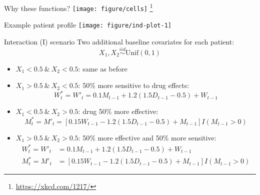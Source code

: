 \documentclass[handout]{beamer}
\newcommand\blfootnote[1]{%
  \begingroup
  \renewcommand\thefootnote{}\footnote{#1}%
  \addtocounter{footnote}{-1}%
  \endgroup
}
\begin{document}
\begin{frame}[c]{Why these functions?}
  \centering
  \texttt{[image: figure/cells]}
  \bigskip
  \blfootnote{\url{https://xkcd.com/1217/}}
\end{frame}

\begin{frame}[c]{Example patient profile}
  \texttt{[image: figure/ind-plot-1]} 
\end{frame}

\begin{frame}[c]{Interaction (I) scenario}
  Two additional baseline covariates for each patient:
  \begin{equation*}
    X_{1}, X_{2} \overset{iid}{\sim} \text{Unif}(0, 1)
  \end{equation*}
  
  \begin{itemize}[<+->]
    \item[] $X_{1} < 0.5 \ \& \ X_{2} < 0.5$: same as before
    \item[] $X_{1} > 0.5 \ \& \ X_{2} < 0.5$: 50\% more sensitive to drug effects:
  \begin{equation*}
  W^{*}_{t} = W'_{t} = 0.1 M_{t-1} + 1.2 (\mathbf{1.5} D_{t-1} - 0.5) + W_{t - 1}
  \end{equation*}
  \item[] $X_{1} < 0.5 \ \& \ X_{2} > 0.5$: drug 50\% more effective:
  \begin{equation*}
  M^{*}_{t} =  M'_{t} = [0.15 W_{t-1} - 1.2 (\mathbf{1.5} D_{t-1} - 0.5) + M_{t - 1}] I(M_{t-1} > 0)
  \end{equation*}
  \item[]   $X_{1} > 0.5 \ \& \ X_{2} > 0.5$: 50\% more effective and 50\% more sensitive:
  \begin{align*}
  W^{*}_{t} = W'_{t} &= 0.1 M_{t-1} + 1.2 (\mathbf{1.5} D_{t-1} - 0.5) + W_{t - 1} \\
  M^{*}_{t} = M'_{t} &= [0.15 W_{t-1} - 1.2 (\mathbf{1.5} D_{t-1} - 0.5) + M_{t - 1}] I(M_{t-1} > 0)
  \end{align*}
  \end{itemize}
\end{frame}
\end{document}
